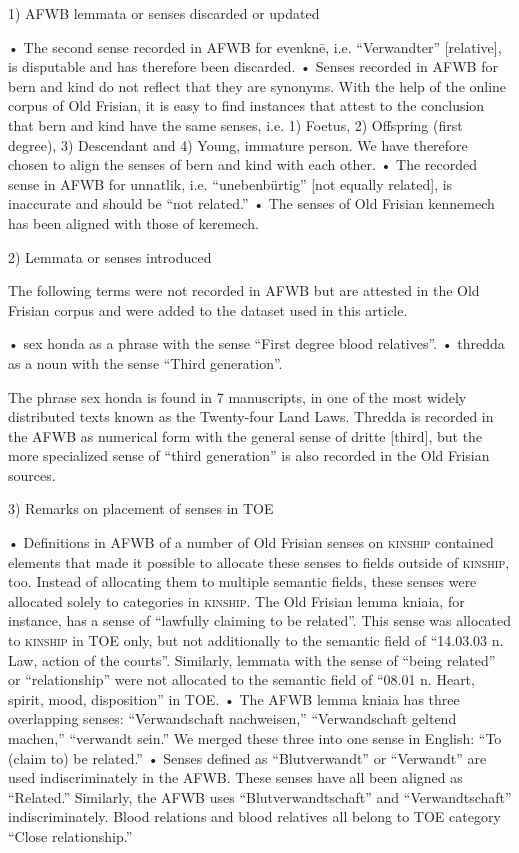 1) AFWB lemmata or senses discarded or updated

•	The second sense recorded in AFWB for evenknē, i.e. “Verwandter” [relative], is disputable and has therefore been discarded.
•	Senses recorded in AFWB for bern and kind do not reflect that they are synonyms. With the help of the online corpus of Old Frisian, it is easy to find instances that attest to the conclusion that bern and kind have the same senses, i.e. 1) Foetus, 2) Offspring (first degree), 3) Descendant and 4) Young, immature person. We have therefore chosen to align the senses of bern and kind with each other.
•	The recorded sense in AFWB for unnatlik, i.e. “unebenbürtig” [not equally related], is inaccurate and should be “not related.”
•	The senses of Old Frisian kennemech has been aligned with those of keremech.

2) Lemmata or senses introduced

The following terms were not recorded in AFWB but are attested in the Old Frisian corpus and were added to the dataset used in this article.

•	sex honda as a phrase with the sense “First degree blood relatives”.
•	thredda as a noun with the sense “Third generation”.

The phrase sex honda is found in 7 manuscripts, in one of the most widely distributed texts known as the Twenty-four Land Laws.  Thredda is recorded in the AFWB as numerical form with the general sense of dritte [third], but the more specialized sense of “third generation” is also recorded in the Old Frisian sources. 

3) Remarks on placement of senses in TOE

•	Definitions in AFWB of a number of Old Frisian senses on \textsc{kinship} contained elements that made it possible to allocate these senses to fields outside of \textsc{kinship}, too. Instead of allocating them to multiple semantic fields, these senses were allocated solely to categories in \textsc{kinship}. The Old Frisian lemma kniaia, for instance, has a sense of “lawfully claiming to be related”. This sense was allocated to \textsc{kinship} in TOE only, but not additionally to the semantic field of “14.03.03 n. Law, action of the courts”.  Similarly, lemmata with the sense of “being related” or “relationship” were not allocated to the semantic field of “08.01 n. Heart, spirit, mood, disposition” in TOE. 
•	The AFWB lemma kniaia has three overlapping senses: “Verwandschaft nachweisen,” “Verwandschaft geltend machen,” “verwandt sein.” We merged these three into one sense in English: “To (claim to) be related.”
•	Senses defined as “Blutverwandt” or “Verwandt” are used indiscriminately in the AFWB. These senses have all been aligned as “Related.” Similarly, the AFWB uses “Blutverwandtschaft” and “Verwandtschaft” indiscriminately. Blood relations and blood relatives all belong to TOE category “Close relationship.”

